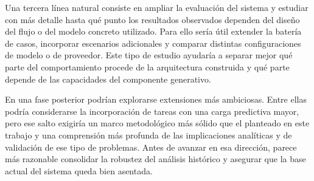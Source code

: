 Una tercera l\'inea natural consiste en ampliar la evaluaci\'on del sistema y estudiar con m\'as detalle hasta qu\'e punto los resultados observados dependen del 
dise\~no del flujo o del modelo concreto utilizado. Para ello ser\'ia \'util extender la bater\'ia de casos, incorporar escenarios adicionales y comparar distintas 
configuraciones de modelo o de proveedor. Este tipo de estudio ayudar\'ia a separar mejor qu\'e parte del comportamiento procede de la arquitectura construida y qu\'e 
parte depende de las capacidades del componente generativo.

En una fase posterior podr\'ian explorarse extensiones m\'as ambiciosas. Entre ellas podr\'ia considerarse la incorporaci\'on de tareas con una carga predictiva mayor, 
pero ese salto exigir\'ia un marco metodol\'ogico m\'as s\'olido que el planteado en este trabajo y una comprensi\'on m\'as profunda de las implicaciones anal\'iticas 
y de validaci\'on de ese tipo de problemas. Antes de avanzar en esa direcci\'on, parece m\'as razonable consolidar la robustez del an\'alisis hist\'orico y asegurar 
que la base actual del sistema queda bien asentada.
